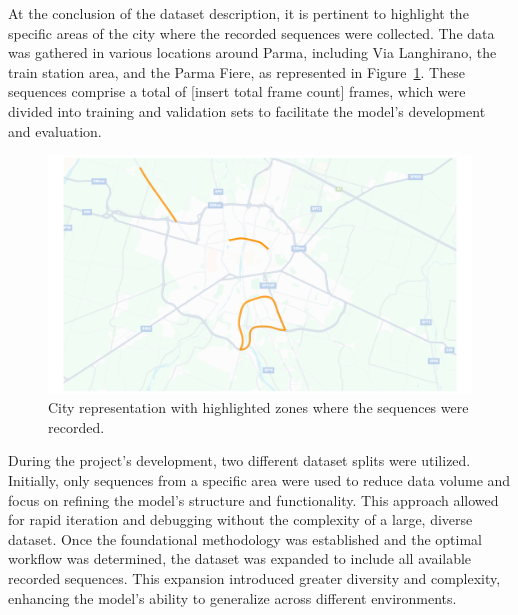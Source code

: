 At the conclusion of the dataset description, it is pertinent to highlight the specific areas of the city where the recorded sequences were collected. The data was gathered in various locations around Parma, including Via Langhirano, the train station area, and the Parma Fiere, as represented in Figure~\ref{fig:dataset_map}. These sequences comprise a total of [insert total frame count] frames, which were divided into training and validation sets to facilitate the model's development and evaluation.
\begin{figure}[H]
    \centering
    \includegraphics[width=1\linewidth]{LateX//figs/sequence_map.pdf}
    \caption{City representation with highlighted zones where the sequences were recorded.}
    \label{fig:dataset_map}
\end{figure}

During the project's development, two different dataset splits were utilized. Initially, only sequences from a specific area were used to reduce data volume and focus on refining the model's structure and functionality. This approach allowed for rapid iteration and debugging without the complexity of a large, diverse dataset. Once the foundational methodology was established and the optimal workflow was determined, the dataset was expanded to include all available recorded sequences. This expansion introduced greater diversity and complexity, enhancing the model's ability to generalize across different environments.

